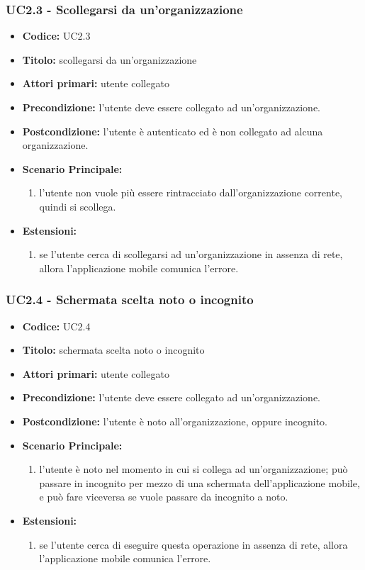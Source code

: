 \documentclass[casi-duso]{subfiles}
\begin{document}
\subsubsection{UC2.3 - Scollegarsi da un'organizzazione}
\label{sub:uc2.1utente}
\begin{itemize}
  \item \textbf{Codice:} UC2.3
  \item \textbf{Titolo:} scollegarsi da un'organizzazione
  \item \textbf{Attori primari:} utente collegato 
  \item \textbf{Precondizione:} l'utente deve essere collegato ad un'organizzazione.
  \item \textbf{Postcondizione:} l'utente è autenticato ed è non collegato ad alcuna organizzazione.
  \item \textbf{Scenario Principale:}
  \begin{enumerate}
    \item l'utente non vuole più essere rintracciato dall'organizzazione corrente, quindi si scollega.
  \end{enumerate}
  \item \textbf{Estensioni:} 
  \begin{enumerate}
    \item se l'utente cerca di scollegarsi ad un'organizzazione in assenza di rete, allora l'applicazione mobile comunica l'errore.
  \end{enumerate}
\end{itemize}

\subsubsection{UC2.4 - Schermata scelta noto o incognito}
\label{sub:uc2.1utente}
\begin{itemize}
  \item \textbf{Codice:} UC2.4
  \item \textbf{Titolo:} schermata scelta noto o incognito
  \item \textbf{Attori primari:} utente collegato
  \item \textbf{Precondizione:} l'utente deve essere collegato ad un'organizzazione.
  \item \textbf{Postcondizione:} l'utente è noto all'organizzazione, oppure incognito.
  \item \textbf{Scenario Principale:}
  \begin{enumerate}
    \item l'utente è noto nel momento in cui si collega ad un'organizzazione; può passare in incognito per mezzo di una schermata dell'applicazione mobile, e può fare viceversa se vuole passare
    da incognito a noto.
  \end{enumerate}
  \item \textbf{Estensioni:} 
  \begin{enumerate}
    \item se l'utente cerca di eseguire questa operazione in assenza di rete, allora l'applicazione mobile comunica l'errore.
  \end{enumerate}
\end{itemize}
\end{document}

